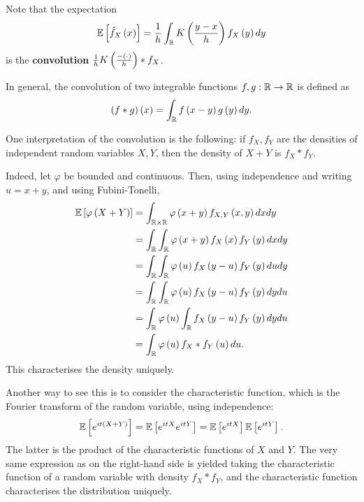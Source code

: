 \begin{remark}
  Note that the expectation
  \begin{equation*}
    \mathbb{E}\left[\hat{f}_X\left(x\right)\right] = \frac{1}{h}\int_{\mathbb{R}} K\left(\frac{y-x}{h}\right) f_X\left(y\right)dy
  \end{equation*}
  is the \textbf{convolution} $\frac{1}{h} K\left(\frac{- \left(\cdot\right)}{h}\right)\ast f_X$.

  In general, the convolution of two integrable functions $f,g:\mathbb{R}\rightarrow \mathbb{R}$
  is defined as
  \begin{equation*}
    \left(f\ast g\right)\left(x\right) = \int_{\mathbb{R}} f\left(x-y\right) g\left(y\right) dy.
  \end{equation*}

  One interpretation of the convolution is the following: if $f_X,f_Y$ are the
  densities of independent random variables $X,Y$, then the density of $X+Y$ is
  $f_X\ast f_Y$.

  Indeed, let $\varphi$ be bounded and continuous. Then, using independence and
  writing $u=x+y$, and using Fubini-Tonelli,
  \begin{equation*}
    \begin{split}
      \mathbb{E}\left[\varphi\left(X+Y\right)\right] & =\int_{\mathbb{R}\times \mathbb{R}} \varphi \left(x+y\right) f_{X,Y}\left(x,y\right) dx dy  \\
                              & = \int_{\mathbb{R}} \int_{\mathbb{R}} \varphi\left(x+y\right)f_X\left(x\right)f_Y\left(y\right) dx dy   \\
                              & = \int_{\mathbb{R}} \int_{\mathbb{R}} \varphi\left(u\right) f_X\left(y-u\right) f_Y\left(y\right) du dy \\
                              & = \int_{\mathbb{R}} \int_{\mathbb{R}} \varphi\left(u\right) f_X\left(y-u\right)f_Y\left(y\right) dy du  \\
                              & =\int_{\mathbb{R}} \varphi\left(u\right)\int_{\mathbb{R}} f_X\left(y-u\right)f_Y\left(y\right) dy du    \\
                              & =\int_{\mathbb{R}} \varphi\left(u\right) f_X\ast f_Y \left(u\right) du.
    \end{split}
  \end{equation*}
  This characterises the density uniquely.

  Another way to see this is to consider the characteristic function, which is
  the Fourier transform of the random variable, using independence:
  \begin{equation*}
    \mathbb{E}\left[e^{it\left(X+Y\right)}\right] = \mathbb{E}\left[e^{itX}e^{itY}\right] = \mathbb{E}\left[e^{itX}\right]\mathbb{E}\left[e^{itY}\right].
  \end{equation*}
  The latter is the product of the characteristic functions of $X$ and $Y$. The very same expression as on the right-hand side is yielded taking the characteristic function of a random variable with density $f_X\ast f_Y$, and the characteristic function characterises the distribution uniquely.
\end{remark}
